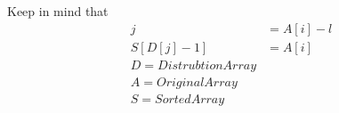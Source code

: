 \documentclass[preview]{standalone}
\begin{document}
\begin{center}
Keep in mind that\begin{align*}j & = A[i] - l \\S[D[j] - 1] & = A[i]\\D = Distrubtion Array\\A = Original Array\\S = Sorted Array\\\end{align*}
\end{center}
\end{document}
